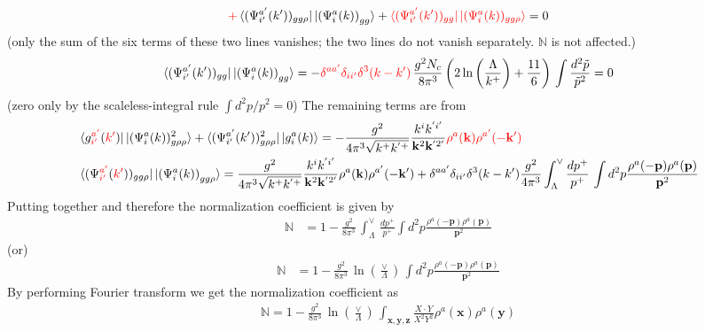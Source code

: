 \documentclass[aps,prd,amsmath,amssymb,nofootinbib]{revtex4-2}
\def\mf#1{\mathbb{#1}}
\def\v#1{\mathbf{#1}}
\numberwithin{equation}{section}
\begin{document}
$${\color{red}+}\bra{(\Psi^{a'}_{i'}(k'))_{gg\rho} }\ket{ \left(\Psi^{a}_{i}(k) \right)_{gg} } + {\color{red}\bra{(\Psi^{a'}_{i'}(k'))_{gg} }\ket{(\Psi^{a}_{i}(k))_{gg\rho} }} = 0 $$ {\color{red}(only the sum of the six terms of these two lines vanishes; the two lines do not vanish separately. $\mf{N}$ is not affected.)}
$$\bra{(\Psi^{a'}_{i'}(k'))_{gg} }\ket{ \left(\Psi^{a}_{i}(k) \right)_{gg} } = -{\color{red}\delta^{aa'}\delta_{ii'}\delta^{3}(k-k')\,}\frac{g^2N_c}{8\pi^3} \left(  2 \ln \bigg(\frac{\Lambda}{k^{+}} \bigg) + \frac{11}{6}  \right) \,\int \frac{d^2\tilde p}{\tilde p^2} = 0 $$ {\color{red}(zero only by the scaleless-integral rule $\int d^{2}p/p^{2}=0$)}
The remaining terms are from
\begin{align}
   & \bra{g^{{\color{red}a'}}_{{\color{red}i'}}({\color{red}k'})}\ket{(\Psi^{a}_{i}(k))^{2}_{g\rho\rho} } + \bra{(\Psi^{a'}_{i'}(k'))^{2}_{g\rho\rho} }\ket{g^{a}_{i}(k)}  = -\frac{g^2}{4 \pi^3 \sqrt{k^+ k^{'+}}} \frac{k^{i} k^{'i'}}{\v{k}^2\v{k}^{'2'}} {\color{red}\rho^a (\v{k})\rho^{a'} (-\v{k}')} \notag \\ & \bra{(\Psi^{{\color{red}a'}}_{{\color{red}i'}}({\color{red}k'}))_{gg\rho} }\ket{ \left(\Psi^{a}_{i}(k) \right)_{gg\rho} } = \frac{g^2}{4 \pi^3 \sqrt{k^+ k^{'+}}} \frac{k^{i} k^{'i'}}{\v{k}^2\v{k}^{'2'}}\rho^a (\v{k}) \rho^{a'} (-\v{k}')+ 
 \delta^{a a'} \delta_{i i'}  \delta^3(k-k')  
  \frac{g^2}{4 \pi^3 } \int_{\Lambda}^{\vee} \frac{dp^{+}}{p^{+}}\,
  \int d^2p \frac{\rho^a(-\v{p}) \rho^a(\v{p})}{\v{p}^2} \nonumber
\end{align}
Putting together and therefore the normalization coefficient is given by 
\begin{align}
\mf{N} & =  
 1 - \frac{g^2}{8 \pi^3 }\, \int_{\Lambda}^{\vee}\,\frac{dp^{+}}{p^{+}}
\int d^2p \frac{\rho^a(-\v{p}) \rho^a(\v{p})}{\v{p}^2}
\end{align}
(or)
\begin{align}
\mf{N} & =  
 1 - \frac{g^2}{8 \pi^3 }\,\ln\left(\frac{\vee}{\Lambda}\right)\,
\int d^2p \frac{\rho^a(-\v{p}) \rho^a(\v{p})}{\v{p}^2}
\end{align}
By performing Fourier transform we get the normalization coefficient as
\begin{align}
\mf{N} =  
 1 - \frac{g^2}{8 \pi^3 }\,\ln\left(\frac{\vee}{\Lambda}\right)\, 
  \int_{\v{x}, \v{y},\v{z}} \frac{X\cdot Y}{X^2 Y^2}   \rho^a(\v{x}) \rho^a(\v{y})
\end{align}
\newpage
\end{document}
